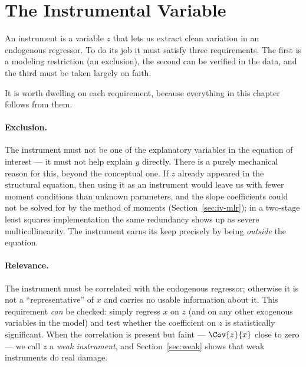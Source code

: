 \section{The Instrumental Variable}

An instrument is a variable $z$ that lets us extract clean variation in an endogenous regressor. To do its job it must satisfy three requirements. The first is a modeling restriction (an exclusion), the second can be verified in the data, and the third must be taken largely on faith.


It is worth dwelling on each requirement, because everything in this chapter follows from them.

\paragraph{Exclusion.} The instrument must not be one of the explanatory variables in the equation of interest --- it must not help explain $y$ directly. There is a purely mechanical reason for this, beyond the conceptual one. If $z$ already appeared in the structural equation, then using it as an instrument would leave us with fewer moment conditions than unknown parameters, and the slope coefficients could not be solved for by the method of moments (Section~\ref{sec:iv-mlr}); in a two-stage least squares implementation the same redundancy shows up as severe multicollinearity. The instrument earns its keep precisely by being \emph{outside} the equation.

\paragraph{Relevance.} The instrument must be correlated with the endogenous regressor; otherwise it is not a ``representative'' of $x$ and carries no usable information about it. This requirement \emph{can} be checked: simply regress $x$ on $z$ (and on any other exogenous variables in the model) and test whether the coefficient on $z$ is statistically significant. When the correlation is present but faint --- $\Cov{z}{x}$ close to zero --- we call $z$ a \emph{weak instrument}, and Section~\ref{sec:weak} shows that weak instruments do real damage.

